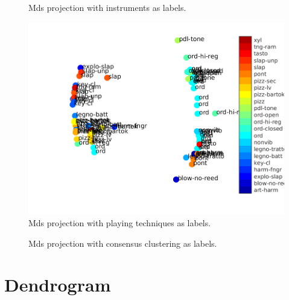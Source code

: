 \documentclass{article}
\begin{document}
\begin{figure}
\center
\caption{Mds projection with instruments as labels.}
\label{fig:projectionI}
\end{figure}


\begin{figure}
\center
\includegraphics[width = \textwidth]{figures/AllClassModes33}
\caption{Mds projection with playing techniques as labels.}
\label{fig:projectionM}
\end{figure}


\begin{figure}
\center
\caption{Mds projection with consensus clustering as labels.}
\label{fig:projectionC}
\end{figure}






\section{Dendrogram}
\end{document}

